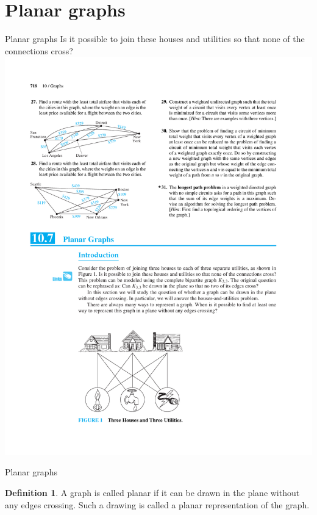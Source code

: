 \documentclass{beamer}
\theoremstyle{definition}
\newtheorem{defn}{Definition}[section]
\begin{document}
\section{Planar graphs}

\begin{frame}{Planar graphs}
    Is it possible to join these houses and utilities so that none of the connections cross?\\
    \centering \includegraphics[trim={5cm 3cm 9cm 19cm}, clip, width=.5\linewidth]{p718}
\end{frame}

\begin{frame}{Planar graphs}
    \begin{defn}
        A graph is called planar if it can be drawn in the plane without any edges crossing. Such a drawing is called a planar representation of the graph.
    \end{defn}
\end{frame}
\end{document}

